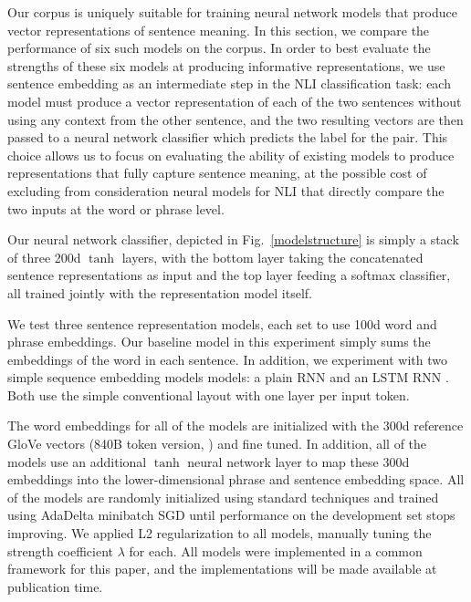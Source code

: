 Our corpus is uniquely suitable for training neural network models that produce vector representations of sentence meaning. In this section, we compare the performance of six such models on the corpus. 
In order to best evaluate the strengths of these six models at producing informative representations, we use sentence embedding as an intermediate step in the NLI classification task: each model must produce a vector representation of each of the two sentences without using any context from the other sentence, and the two resulting vectors are then passed to a neural network classifier which predicts the label for the pair. This choice allows us to focus on evaluating the ability of existing models to produce representations that fully capture sentence meaning, at the possible cost of excluding from consideration neural models for NLI that directly compare the two inputs at the word or phrase level.



Our neural network classifier, depicted in Fig.~\ref{modelstructure} is simply a stack of three 200d $\tanh$ layers, with the bottom layer taking the concatenated sentence representations as input and the top layer feeding a softmax classifier, all trained jointly with the representation model itself.

We test three sentence representation models, each set to use 100d word and phrase embeddings. Our baseline model in this experiment simply sums the embeddings of the word in each sentence. In addition, we experiment with two simple sequence embedding models models: a plain RNN and an LSTM RNN \cite{hochreiter1997long}. Both use the simple conventional layout with one layer per input token.

The word embeddings for all of the models are initialized with the 300d reference GloVe vectors (840B token version, \citealt{pennington2014glove}) and fine tuned. In addition, all of the models use an additional $\tanh$ neural network layer to map these 300d embeddings into the lower-dimensional phrase and sentence embedding space. All of the models are randomly initialized using standard techniques and trained using AdaDelta \cite{zeiler2012adadelta} minibatch SGD until performance on the development set stops improving. We applied L2 regularization to all models, manually tuning the strength coefficient $\lambda$ for each. All models were implemented in a common framework for this paper, and the implementations will be made available at publication time.


